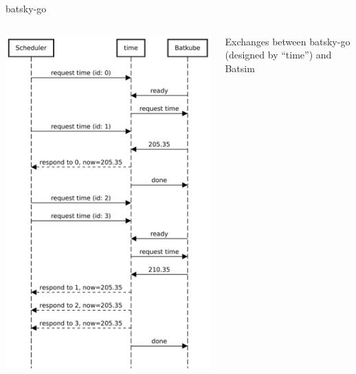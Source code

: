 \documentclass[12pt, aspectratio=43]{beamer}
\begin{document}
\begin{frame}{batsky-go}
	\begin{columns}
		\centering
		\includegraphics[scale=0.38]{../imgs/requester-broker.pdf}
		
		Exchanges between batsky-go (designed by ``time'') and Batsim
	\end{columns}
\end{frame}
\end{document}

